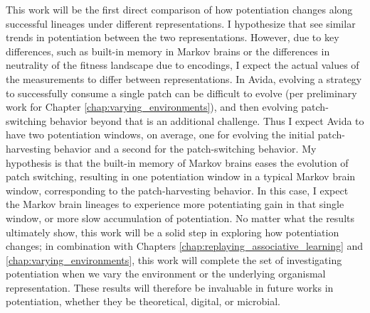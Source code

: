 This work will be the first direct comparison of how potentiation changes along successful lineages under different representations. 
I hypothesize that see similar trends in potentiation between the two representations. 
However, due to key differences, such as built-in memory in Markov brains or the differences in neutrality of the fitness landscape due to encodings, I expect the actual values of the measurements to differ between representations. 
In Avida, evolving a strategy to successfully consume a single patch can be difficult to evolve (per preliminary work for Chapter \ref{chap:varying_environments}), and then evolving patch-switching behavior beyond that is an additional challenge. 
Thus I expect Avida to have two potentiation windows, on average, one for evolving the initial patch-harvesting behavior and a second for the patch-switching behavior.
My hypothesis is that the built-in memory of Markov brains eases the evolution of patch switching, resulting in one potentiation window in a typical Markov brain window, corresponding to the patch-harvesting behavior. 
In this case, I expect the Markov brain lineages to experience more potentiating gain in that single window, or more slow accumulation of potentiation. 
No matter what the results ultimately show, this work will be a solid step in exploring how potentiation changes; in combination with Chapters \ref{chap:replaying_associative_learning} and \ref{chap:varying_environments}, this work will complete the set of investigating potentiation when we vary the environment or the underlying organismal representation. 
These results will therefore be invaluable in future works in potentiation, whether they be theoretical, digital, or microbial.